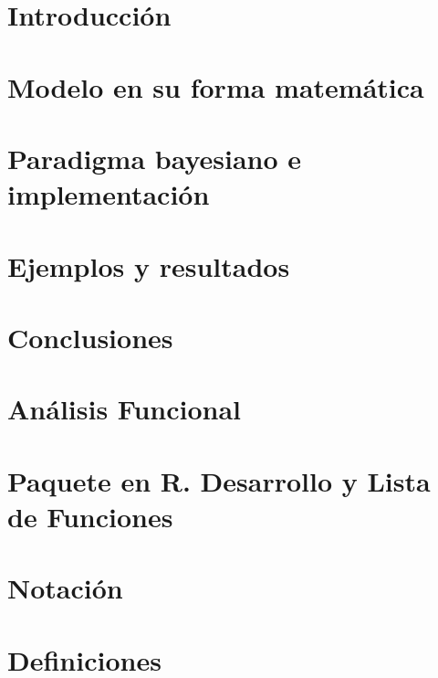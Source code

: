 \documentclass[pdftex,11pt]{report}
\begin{document}
 
%

\pagebreak
\tableofcontents


\chapter{Introducción} \label{cap:Intro}


\chapter{Modelo en su forma matemática} \label{cap:Modelo}


\chapter{Paradigma bayesiano e implementación} \label{cap:BayesAlgoritmo}


\chapter{Ejemplos y resultados} \label{cap:EjYRes}


\chapter{Conclusiones} \label{cap:Conclusiones}



\appendix
\chapter{Análisis Funcional} \label{ap:AnalisisFunc}


\chapter{Paquete en R. Desarrollo y Lista de Funciones} \label{ap:Paquete}


\chapter{Notación} \label{ap:Notacion}


\chapter{Definiciones} \label{ap:Definiciones}


\printbibliography
\end{document}

